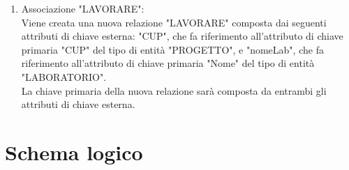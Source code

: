 \begin{itemize}
\begin{enumerate}
            \item Associazione "LAVORARE":\\
                Viene creata una nuova relazione "LAVORARE" composta dai seguenti attributi di chiave esterna: "CUP", che fa riferimento all'attributo di chiave primaria "CUP" del tipo di entità "PROGETTO", e "nomeLab", che fa riferimento all'attributo di chiave primaria "Nome" del tipo di entità "LABORATORIO".\\
                La chiave primaria della nuova relazione sarà composta da entrambi gli attributi di chiave esterna.

        \end{enumerate}
    \end{itemize}

    \newpage
    \section{Schema logico}
